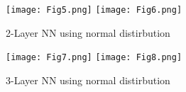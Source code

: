\documentclass[a4paper,10pt,twocolumn]{article}
\begin{document}
\begin{figure}[h!]
\centering
\texttt{[image: Fig5.png]}
\texttt{[image: Fig6.png]}
\caption*{2-Layer NN using normal distirbution}
\end{figure}

\begin{figure}[h!]
\centering
\texttt{[image: Fig7.png]}
\texttt{[image: Fig8.png]}
\caption*{3-Layer NN using normal distirbution}
\end{figure}
\end{document}
